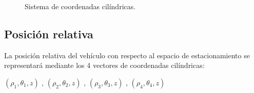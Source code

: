 \begin{figure}[!ht]
\begin{subfigure}{0.4\textwidth}
    \end{subfigure}
    \caption{Sistema de coordenadas cilíndricas.}
    \label{fig:coord3}
\end{figure}

\subsection{Posición relativa}
La posición relativa del vehículo con respecto al espacio de estacionamiento se representará mediante los 4 vectores de coordenadas cilíndricas:\\
\begin{center}
    $(\rho_1, \theta_1, z)$ , $(\rho_2, \theta_2, z)$ , $(\rho_3, \theta_3, z)$ , $(\rho_4, \theta_4, z)$ \\

\end{center}




